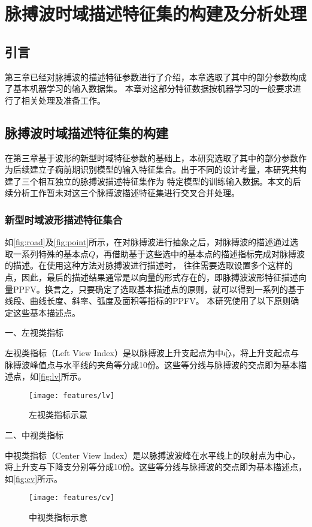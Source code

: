 \chapter{脉搏波时域描述特征集的构建及分析处理}
\section{引言}
第三章已经对脉搏波的描述特征参数进行了介绍，本章选取了其中的部分参数构成了基本机器学习的输入数据集。
本章对这部分特征数据按机器学习的一般要求进行了相关处理及准备工作。

\section{脉搏波时域描述特征集的构建}
在第三章基于波形的新型时域特征参数的基础上，本研究选取了其中的部分参数作为后续建立子痫前期识别模型的输入特征集合。出于不同的设计考量，本研究共构建了三个相互独立的脉搏波描述特征集作为
特定模型的训练输入数据。本文的后续分析工作暂未对这三个脉搏波描述特征集进行交叉合并处理。

\subsection{新型时域波形描述特征集合}

如\autoref{fig:road}及\autoref{fig:point}所示，在对脉搏波进行抽象之后，对脉搏波的描述通过选取一系列特殊的基本点$Q$，再借助基于这些选中的基本点的描述指标完成对脉搏波的描述。在使用这种方法对脉搏波进行描述时，
往往需要选取设置多个这样的点，因此，最后的描述结果通常是以向量的形式存在的，即脉搏波波形特征描述向量PPFV。换言之，只要确定了选取基本描述点的原则，就可以得到一系列的基于线段、曲线长度、斜率、弧度及面积等指标的PPFV。
本研究使用了以下原则确定这些基本描述点。

一、左视类指标

左视类指标（Left View Index）是以脉搏波上升支起点为中心，将上升支起点与脉搏波峰值点与水平线的夹角等分成10份。这些等分线与脉搏波的交点即为基本描述点，如\autoref{fig:lv}所示。
\begin{figure}[htbp]
  \centering
  \texttt{[image: features/lv]}
  \caption{\label{fig:lv}左视类指标示意}
\end{figure}

二、中视类指标

中视类指标（Center View Index）是以脉搏波波峰在水平线上的映射点为中心，将上升支与下降支分别等分成10份。这些等分线与脉搏波的交点即为基本描述点，如\autoref{fig:cv}所示。
\begin{figure}[htbp]
  \centering
  \texttt{[image: features/cv]}
  \caption{\label{fig:lv}中视类指标示意}
\end{figure}

